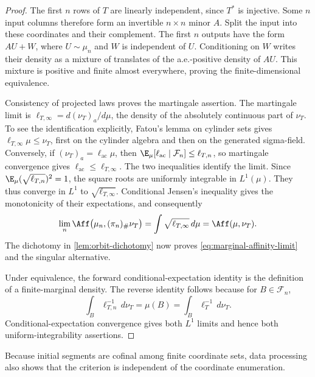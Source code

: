 \begin{proof}
The first \(n\) rows of \(T\) are linearly independent, since \(T^*\)
is injective.  Some \(n\) input columns therefore form an invertible
\(n\times n\) minor \(A\).  Split the input into these coordinates
and their complement.  The first \(n\) outputs have the form
\(AU+W\), where \(U\sim\mu_n\) and \(W\) is independent of \(U\).
Conditioning on \(W\) writes their density as a mixture of translates
of the a.e.-positive density of \(AU\).  This mixture is positive
and finite almost everywhere, proving the finite-dimensional equivalence.

Consistency of projected laws proves the martingale assertion.  The
martingale limit is
\(\ell_{T,\infty}=d(\nu_T)_a/d\mu\), the density of the absolutely continuous
part of \(\nu_T\).  To see the identification explicitly, Fatou's lemma
on cylinder sets gives \(\ell_{T,\infty}\mu\leq\nu_T\), first on the cylinder
algebra and then on the generated sigma-field.  Conversely, if
\((\nu_T)_a=\ell_{\mathrm{ac}}\mu\), then
\(\E_\mu[\ell_{\mathrm{ac}}\mid\mathcal F_n]\leq \ell_{T,n}\), so martingale
convergence gives \(\ell_{\mathrm{ac}}\leq \ell_{T,\infty}\).  The two inequalities identify
the limit.
Since \(\E_\mu(\sqrt{\ell_{T,n}})^2=1\), the square roots are uniformly
integrable in \(L^1(\mu)\).  They thus converge in \(L^1\) to
\(\sqrt{\ell_{T,\infty}}\).  Conditional Jensen's inequality gives the
monotonicity of their expectations, and consequently
\[
  \lim_n\Aff\bigl(\mu_n,(\pi_n)_\#\nu_T\bigr)
      =\int\sqrt{\ell_{T,\infty}}\,d\mu
      =\Aff(\mu,\nu_T).
\]
The dichotomy in \cref{lem:orbit-dichotomy} now proves
\eqref{eq:marginal-affinity-limit} and the singular alternative.

Under equivalence, the forward conditional-expectation identity is the
definition of a finite-marginal density.  The reverse identity follows because
for \(B\in\mathcal F_n\),
\[
  \int_B \ell_{T,n}^{-1}\,d\nu_T=\mu(B)
       =\int_B \ell_T^{-1}\,d\nu_T.
\]
Conditional-expectation convergence gives both \(L^1\) limits and hence
both uniform-integrability assertions.
\end{proof}

Because initial segments are cofinal among finite coordinate sets, data
processing also shows that the criterion is independent of the coordinate
enumeration.
